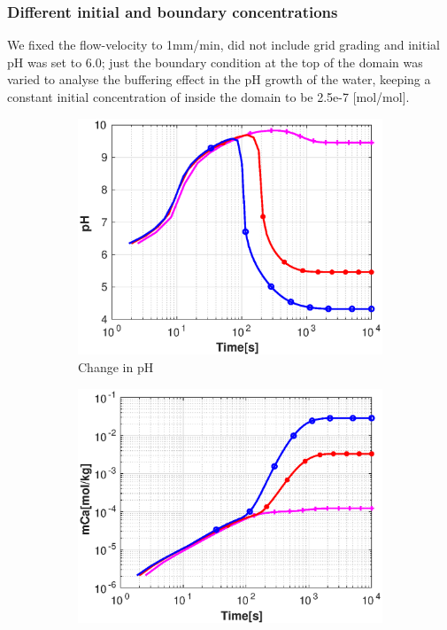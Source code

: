 \subsubsection*{Different initial and boundary  concentrations} \label{ssec:diffInitialBC}
We fixed the flow-velocity to 1mm/min, did not include grid grading and initial pH was set to 6.0; just the boundary condition at the top of the domain was varied to analyse the buffering effect in the pH growth of the water, keeping a constant initial concentration of  inside the domain to be 2.5e-7 [mol/mol].

\begin{figure}[!h]
        \centering
    \begin{subfigure}{.5\linewidth}
            \centering
        \includegraphics[width=\textwidth]{PICTURES/with_CO2_pH.eps}
        \caption{Change in pH}
        \label{fig:CO2pH}
    \end{subfigure}%
        \hfill
    \begin{subfigure}{.5\linewidth}
            \centering
        \includegraphics[width=\textwidth]{PICTURES/with_CO2_mCa.eps}

\end{subfigure}
\end{figure}
